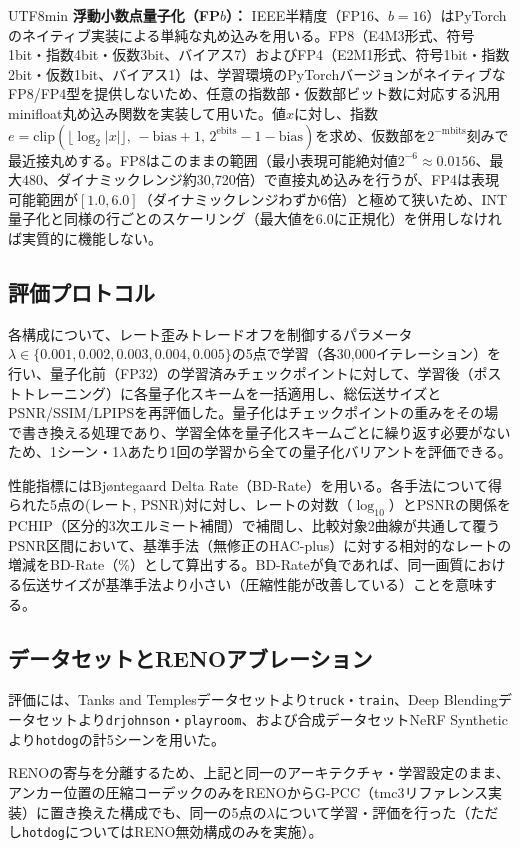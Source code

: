 \documentclass{ieeeaccess}
\begin{document}
\begin{CJK}{UTF8}{min}
\textbf{浮動小数点量子化（FP$b$）：} IEEE半精度（FP16、$b=16$）はPyTorchのネイティブ実装による単純な丸め込みを用いる。FP8（E4M3形式、符号1bit・指数4bit・仮数3bit、バイアス7）およびFP4（E2M1形式、符号1bit・指数2bit・仮数1bit、バイアス1）は、学習環境のPyTorchバージョンがネイティブなFP8/FP4型を提供しないため、任意の指数部・仮数部ビット数に対応する汎用minifloat丸め込み関数を実装して用いた。値$x$に対し、指数$e = \mathrm{clip}(\lfloor \log_2 |x| \rfloor,\, -\mathrm{bias}+1,\, 2^{\mathrm{ebits}}-1-\mathrm{bias})$を求め、仮数部を$2^{-\mathrm{mbits}}$刻みで最近接丸めする。FP8はこのままの範囲（最小表現可能絶対値$2^{-6}\approx0.0156$、最大$480$、ダイナミックレンジ約30{,}720倍）で直接丸め込みを行うが、FP4は表現可能範囲が$[1.0, 6.0]$（ダイナミックレンジわずか6倍）と極めて狭いため、INT量子化と同様の行ごとのスケーリング（最大値を6.0に正規化）を併用しなければ実質的に機能しない。

\subsection{評価プロトコル}
各構成について、レート歪みトレードオフを制御するパラメータ$\lambda \in \{0.001, 0.002, 0.003, 0.004, 0.005\}$の5点で学習（各30{,}000イテレーション）を行い、量子化前（FP32）の学習済みチェックポイントに対して、学習後（ポストトレーニング）に各量子化スキームを一括適用し、総伝送サイズとPSNR/SSIM/LPIPSを再評価した。量子化はチェックポイントの重みをその場で書き換える処理であり、学習全体を量子化スキームごとに繰り返す必要がないため、1シーン・1$\lambda$あたり1回の学習から全ての量子化バリアントを評価できる。

性能指標にはBjøntegaard Delta Rate（BD-Rate）\cite{bjontegaard2001}を用いる。各手法について得られた5点の(レート, PSNR)対に対し、レートの対数（$\log_{10}$）とPSNRの関係をPCHIP（区分的3次エルミート補間）で補間し、比較対象2曲線が共通して覆うPSNR区間において、基準手法（無修正のHAC-plus）に対する相対的なレートの増減をBD-Rate（\%）として算出する。BD-Rateが負であれば、同一画質における伝送サイズが基準手法より小さい（圧縮性能が改善している）ことを意味する。

\subsection{データセットとRENOアブレーション}
評価には、Tanks and Temples\cite{knapitsch2017tanks}データセットより\texttt{truck}・\texttt{train}、Deep Blending\cite{hedman2018deep}データセットより\texttt{drjohnson}・\texttt{playroom}、および合成データセットNeRF Synthetic\cite{mildenhall2020nerf}より\texttt{hotdog}の計5シーンを用いた。

RENOの寄与を分離するため、上記と同一のアーキテクチャ・学習設定のまま、アンカー位置の圧縮コーデックのみをRENOからG-PCC（tmc3リファレンス実装）に置き換えた構成でも、同一の5点の$\lambda$について学習・評価を行った（ただし\texttt{hotdog}についてはRENO無効構成のみを実施）。
\end{CJK}
\end{document}
